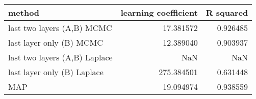 \begin{tabular}{lrr}
\toprule
                        method &  learning coefficient &  R squared \\
\midrule
    last two layers (A,B) MCMC &             17.381572 &   0.926485 \\
      last layer only (B) MCMC &             12.389040 &   0.903937 \\
 last two layers (A,B) Laplace &                   NaN &        NaN \\
   last layer only (B) Laplace &            275.384501 &   0.631448 \\
                           MAP &             19.094974 &   0.938559 \\
\bottomrule
\end{tabular}
